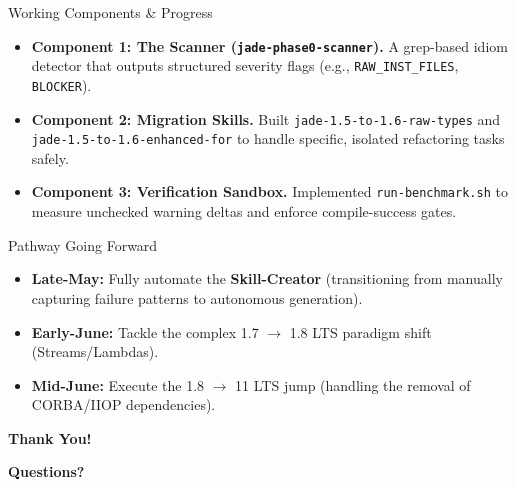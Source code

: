 \documentclass[aspectratio=169]{beamer}
\begin{document}
\begin{frame}{Working Components \& Progress}
\begin{itemize}
  \item \textbf{Component 1: The Scanner (\texttt{jade-phase0-scanner}).} A grep-based idiom detector that outputs structured severity flags (e.g., \texttt{RAW\_INST\_FILES}, \texttt{BLOCKER}).
  \item \textbf{Component 2: Migration Skills.} Built \texttt{jade-1.5-to-1.6-raw-types} and \texttt{jade-1.5-to-1.6-enhanced-for} to handle specific, isolated refactoring tasks safely.
  \item \textbf{Component 3: Verification Sandbox.} Implemented \texttt{run-benchmark.sh} to measure unchecked warning deltas and enforce compile-success gates.
\end{itemize}
\end{frame}

\begin{frame}{Pathway Going Forward}
\begin{itemize}
  \item \textbf{Late-May:} Fully automate the \textbf{Skill-Creator} (transitioning from manually capturing failure patterns to autonomous generation).
  \item \textbf{Early-June:} Tackle the complex 1.7 $\rightarrow$ 1.8 LTS paradigm shift (Streams/Lambdas).
  \item \textbf{Mid-June:} Execute the 1.8 $\rightarrow$ 11 LTS jump (handling the removal of CORBA/IIOP dependencies).
\end{itemize}
\end{frame}

\begin{frame}[plain]
  \centering
  \Huge \textbf{Thank You!}

  \vspace{1.2em}
  \Large \textbf{Questions?}
\end{frame}
\end{document}
